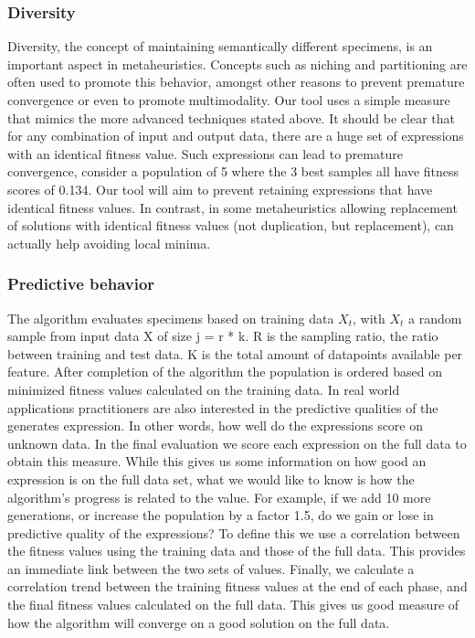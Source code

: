 \subsubsection{Diversity}
Diversity, the concept of maintaining semantically different specimens, is an important aspect in metaheuristics. Concepts such as niching and partitioning are often used to promote this behavior, amongst other reasons to prevent premature convergence or even to promote multimodality.
Our tool uses a simple measure that mimics the more advanced techniques stated above. It should be clear that for any combination of input and output data, there are a huge set of expressions with an identical fitness value. Such expressions can lead to premature convergence, consider a population of 5 where the 3 best samples all have fitness scores of 0.134. Our tool will aim to prevent retaining expressions that have identical fitness values.
In contrast, in some metaheuristics \cite{DE} allowing replacement of solutions with identical fitness values (not duplication, but replacement), can actually help avoiding local minima. 

\subsubsection{Predictive behavior}
The algorithm evaluates specimens based on training data $X_t$, with $X_t$ a random sample from input data X of size j = r * k. R is the sampling ratio, the ratio between training and test data. K is the total amount of datapoints available per feature. 
After completion of the algorithm the population is ordered based on minimized fitness values calculated on the training data. 
In real world applications practitioners are also interested in the predictive qualities of the generates expression. In other words, how well do the expressions score on unknown data. In the final evaluation we score each expression on the full data to obtain this measure. 
While this gives us some information on how good an expression is on the full data set, what we would like to know is how the algorithm's progress is related to the value. For example, if we add 10 more generations, or increase the population by a factor 1.5, do we gain or lose in predictive quality of the expressions? To define this we use a correlation between the fitness values using the training data and those of the full data. 
This provides an immediate link between the two sets of values. 
Finally, we calculate a correlation trend between the training fitness values at the end of each phase, and the final fitness values calculated on the full data. This gives us good measure of how the algorithm will converge on a good solution on the full data. 

